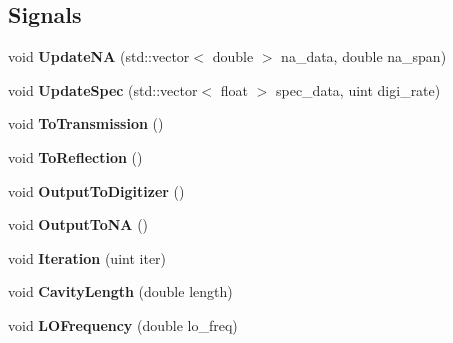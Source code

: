 \subsection*{Signals}
\begin{DoxyCompactItemize}
\item 
void {\bfseries Update\+NA} (std\+::vector$<$ double $>$ na\+\_\+data, double na\+\_\+span)\hypertarget{classetig_1_1_program_frame_a824d1e9e44d999d4a5a587b3f9613fa8}{}\label{classetig_1_1_program_frame_a824d1e9e44d999d4a5a587b3f9613fa8}

\item 
void {\bfseries Update\+Spec} (std\+::vector$<$ float $>$ spec\+\_\+data, uint digi\+\_\+rate)\hypertarget{classetig_1_1_program_frame_ad9248e8416130ac077fd4d765382a093}{}\label{classetig_1_1_program_frame_ad9248e8416130ac077fd4d765382a093}

\item 
void {\bfseries To\+Transmission} ()\hypertarget{classetig_1_1_program_frame_ae39d5e3b652f9725e31d8969be4e108b}{}\label{classetig_1_1_program_frame_ae39d5e3b652f9725e31d8969be4e108b}

\item 
void {\bfseries To\+Reflection} ()\hypertarget{classetig_1_1_program_frame_a391fa1884342324998b4a6b12d009db4}{}\label{classetig_1_1_program_frame_a391fa1884342324998b4a6b12d009db4}

\item 
void {\bfseries Output\+To\+Digitizer} ()\hypertarget{classetig_1_1_program_frame_a5a6803a49009713800cab9b931326dc6}{}\label{classetig_1_1_program_frame_a5a6803a49009713800cab9b931326dc6}

\item 
void {\bfseries Output\+To\+NA} ()\hypertarget{classetig_1_1_program_frame_a47f1db16a6ca7f0a2c95c94f11d89128}{}\label{classetig_1_1_program_frame_a47f1db16a6ca7f0a2c95c94f11d89128}

\item 
void {\bfseries Iteration} (uint iter)\hypertarget{classetig_1_1_program_frame_a35e9a4ff69d563cef9f43bf737a17880}{}\label{classetig_1_1_program_frame_a35e9a4ff69d563cef9f43bf737a17880}

\item 
void {\bfseries Cavity\+Length} (double length)\hypertarget{classetig_1_1_program_frame_a6e05071a1bf4649e1ec1082581a451c7}{}\label{classetig_1_1_program_frame_a6e05071a1bf4649e1ec1082581a451c7}

\item 
void {\bfseries L\+O\+Frequency} (double lo\+\_\+freq)\hypertarget{classetig_1_1_program_frame_a1209484236960c92deea722171b2a783}{}\label{classetig_1_1_program_frame_a1209484236960c92deea722171b2a783}

\end{DoxyCompactItemize}
